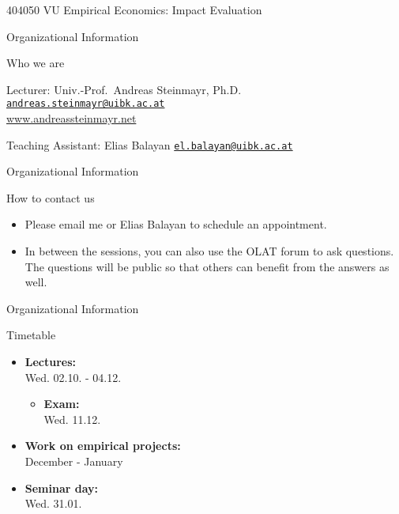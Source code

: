 \documentclass[
  ignorenonframetext,
]{beamer}
\author{}
\date{\vspace{-2.5em}}
\providecommand{\tightlist}{%
  \setlength{\itemsep}{0pt}\setlength{\parskip}{0pt}}
\begin{document}
\begin{frame}

404050 VU Empirical Economics: Impact Evaluation
\end{frame}

\begin{frame}{Organizational Information}
\label{organizational-information}
\begin{block}{Who we are}
\label{who-we-are}
\begin{block}{Lecturer:}
\label{lecturer}
Univ.-Prof.~Andreas Steinmayr, Ph.D.\\
\href{mailto:andreas.steinmayr@uibk.ac.at}{\nolinkurl{andreas.steinmayr@uibk.ac.at}}\\
\href{http://www.andreassteinmayr.net}{www.andreassteinmayr.net}
\end{block}

\begin{block}{Teaching Assistant:}
\label{teaching-assistant}
Elias Balayan
\href{mailto:el.balayan@uibk.ac.at}{\nolinkurl{el.balayan@uibk.ac.at}}
\end{block}
\end{block}
\end{frame}

\begin{frame}{Organizational Information}
\label{organizational-information-1}
\begin{block}{How to contact us}
\label{how-to-contact-us}
\begin{itemize}
\tightlist
\item
  Please email me or Elias Balayan to schedule an appointment.
\item
  In between the sessions, you can also use the OLAT forum to ask
  questions. The questions will be public so that others can benefit
  from the answers as well.
\end{itemize}
\end{block}
\end{frame}

\begin{frame}{Organizational Information}
\label{organizational-information-2}
\begin{block}{Timetable}
\label{timetable}
\begin{itemize}
\tightlist
\item
  \textbf{Lectures:}\\
  Wed. 02.10. - 04.12.

  \begin{itemize}
  \tightlist
  \item
    \textbf{Exam:}\\
    Wed. 11.12.
  \end{itemize}
\item
  \textbf{Work on empirical projects:}\\
  December - January
\item
  \textbf{Seminar day:}\\
  Wed. 31.01.
\end{itemize}
\end{block}
\end{frame}
\end{document}
